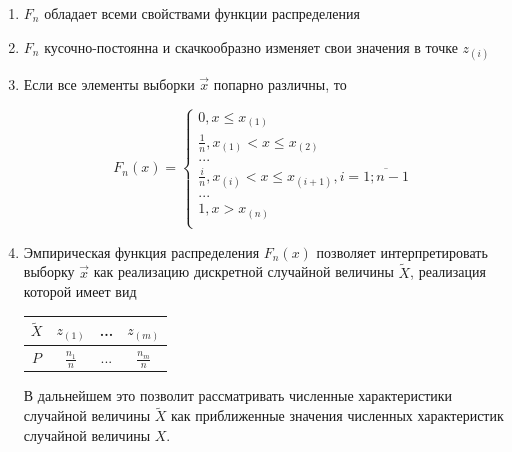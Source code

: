 \begin{note}
    \begin{enumerate}
        \item $F_n$ обладает всеми свойствами функции распределения
        \item $F_n$ кусочно-постоянна и скачкообразно изменяет
            свои значения в точке $z_{(i)}$
        \item Если все элементы выборки $\vec x$ попарно различны, то

            \begin{equation*}
                F_n(x) =
                \begin{cases}
                    0, x \le x_{(1)} \\
                    \frac{1}{n}, x_{(1)} < x \le x_{(2)} \\
                    ... \\
                    \frac{i}{n}, x_{(i)} < x \le x_{(i+1)},
                    i = \overline{1; n-1} \\
                    ... \\
                    1, x > x_{(n)} \\
                \end{cases}
            \end{equation*}

        \item Эмпирическая функция распределения $F_n(x)$ позволяет
            интерпретировать выборку $\vec x$ как реализацию дискретной
            случайной величины $\tilde X$, реализация которой имеет вид

            \begin{table}[H]
                \centering
                \begin{tabular}{|c||c|c|c|}
                    \hline
                    $\tilde X$ & $z_{(1)}$ & ... & $z_{(m)}$ \\
                    \hline
                    $P$ & $\frac{n_1}{n}$ & ... & $\frac{n_m}{n}$ \\
                    \hline
                \end{tabular}
            \end{table}

            В дальнейшем это позволит рассматривать численные
            характеристики случайной величины $\tilde X$
            как приближенные
            значения численных характеристик случайной величины $X$.
    \end{enumerate}
\end{note}

